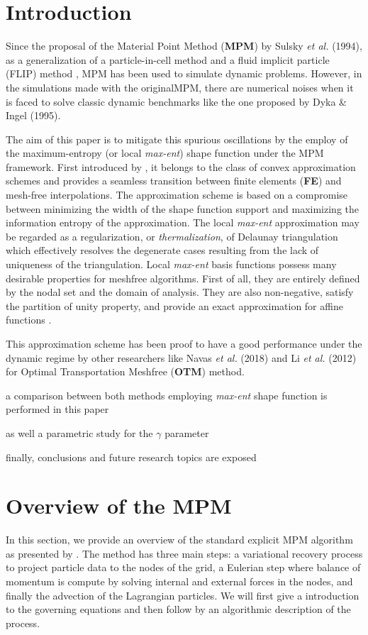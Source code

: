 \section{Introduction}
\label{intro}
Since the proposal of the Material Point Method (\textbf{MPM}) by Sulsky {\it
  et al.} (1994)\cite{Sulsky1994}, as a generalization of
a particle-in-cell method \cite{Harlow1956} and a fluid implicit
particle (FLIP) method \cite{Brackbill1986}, MPM has been used to
simulate dynamic problems. However, in the simulations made with the
originalMPM, there are numerical noises \cite{Tran2019e} when it is faced to solve
classic dynamic benchmarks like the one proposed by Dyka \& Ingel
(1995)\cite{Dyka1995}. 

The aim of this paper is to mitigate this spurious oscillations by the
employ of the maximum-entropy (or local \textit{max-ent}) shape
function under the MPM framework. First introduced by
\cite{Arroyo2006}, it belongs to the class of convex 
approximation schemes and provides a seamless transition between
finite elements (\textbf{FE}) and mesh-free interpolations. The
approximation scheme is based on a compromise between minimizing the
width of the shape function support and maximizing the information
entropy of the approximation. The local \textit{max-ent} approximation
may be regarded as a regularization, or \textit{thermalization}, of
Delaunay triangulation which effectively resolves the degenerate cases
resulting from the lack of uniqueness of the triangulation. Local
\textit{max-ent} basis functions possess many desirable properties for
meshfree algorithms. First of all, they are entirely defined by the
nodal set and the domain of analysis. They are also non-negative, satisfy the partition of unity
property, and provide an exact approximation for affine functions \cite{Arroyo2006}.

This approximation scheme has been proof to have a good performance
under the dynamic regime by other researchers like Navas {\it et al.}
(2018)\cite{Navas2018a} and Li {\it et al.} (2012)\cite{Li2012} for
Optimal Transportation Meshfree (\textbf{OTM}) method.

a comparison between both methods employing \textit{max-ent}  shape
function is performed in this paper

as well a parametric study for the $\gamma$ parameter

finally, conclusions and future research topics are exposed

\section{Overview of the MPM}
\label{sec:mpm-overview}
In this section, we provide an overview of the standard explicit MPM
algorithm as presented by \cite{Sulsky1994}. The method has three main
steps: a variational recovery process to project particle data to the
nodes of the grid, a Eulerian step where balance of momentum is
compute by solving internal and external forces in the nodes, and
finally the advection of the Lagrangian particles. We will first give
a introduction to the governing equations and then follow by an
algorithmic description of the process.

